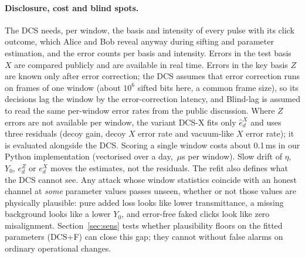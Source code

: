 \paragraph{Disclosure, cost and blind spots.} The DCS needs, per window, the basis and intensity of every pulse with its click outcome, which Alice and Bob reveal anyway during sifting and parameter estimation, and the error counts per basis and intensity. Errors in the test basis $X$ are compared publicly and are available in real time. Errors in the key basis $Z$ are known only after error correction; the DCS assumes that error correction runs on frames of one window (about $10^6$ sifted bits here, a common frame size), so its decisions lag the window by the error-correction latency, and Blind-lag is assumed to read the same per-window error rates from the public discussion. Where $Z$ errors are not available per window, the variant DCS-X fits only $\hat e_d^X$ and uses three residuals (decoy gain, decoy $X$ error rate and vacuum-like $X$ error rate); it is evaluated alongside the DCS. Scoring a single window costs about 0.1\,ms in our Python implementation (vectorised over a day, \dcsLatencyUs\,$\mu$s per window). Slow drift of $\eta$, $Y_0$, $e_d^Z$ or $e_d^X$ moves the estimates, not the residuals. The refit also defines what the DCS cannot see. Any attack whose window statistics coincide with an honest channel at \emph{some} parameter values passes unseen, whether or not those values are physically plausible: pure added loss looks like lower transmittance, a missing background looks like a lower $Y_0$, and error-free faked clicks look like zero misalignment. Section~\ref{sec:sens} tests whether plausibility floors on the fitted parameters (DCS+F) can close this gap; they cannot without false alarms on ordinary operational changes.
